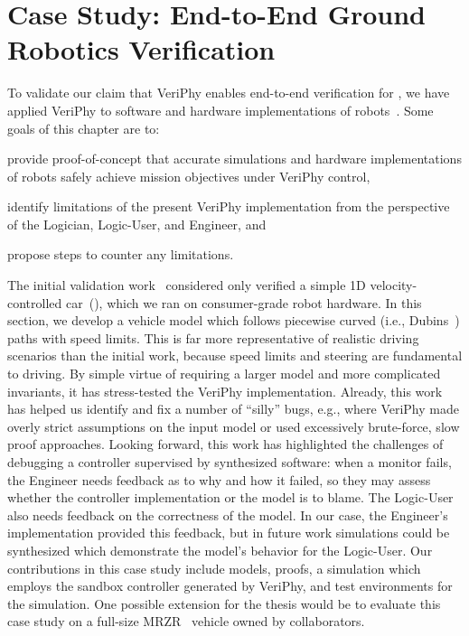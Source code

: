 \documentclass[12pt]{cmuthesis}
\theoremstyle{definition}
\theoremstyle{remark}
\newcommand{\rref}[2][]{\prettyref{#2}}
\newcommand{\VeriPhy}{VeriPhy\xspace}
\begin{document}
\section{Case Study: End-to-End Ground Robotics Verification}
\label{sec:ground-robotics}
To validate our claim that \VeriPhy enables end-to-end verification for \dL, we have applied \VeriPhy to software and hardware implementations of robots~\cite{DBLP:journals/ral/BohrerTMSP19}.
Some goals of this chapter are to:
\begin{inparaenum}[i)]
\item provide proof-of-concept that accurate simulations and hardware implementations of robots safely achieve mission objectives under \VeriPhy control,
\item identify limitations of the present \VeriPhy implementation from the perspective of the Logician, Logic-User, and Engineer, and
\item propose steps to counter any limitations.
\end{inparaenum}
The initial validation work~\cite{DBLP:conf/pldi/BohrerTMMP18} considered only verified a simple 1D velocity-controlled car~(\rref{ex:driving-game}), which we ran on consumer-grade robot hardware.
In this section, we develop a vehicle model which follows piecewise curved (i.e., Dubins~\cite{citeulike:12223454}) paths with speed limits.
This is far more representative of realistic driving scenarios than the initial work, because speed limits and steering are fundamental to driving.
By simple virtue of requiring a larger model and more complicated invariants, it has stress-tested the \VeriPhy implementation.
Already, this work has helped us identify and fix a number of ``silly'' bugs, e.g., where \VeriPhy made overly strict assumptions on the input model or used excessively brute-force, slow proof approaches.
Looking forward, this work has highlighted the challenges of debugging a controller supervised by synthesized software: when a monitor fails, the Engineer needs feedback as to why and how it failed, so they may assess whether the controller implementation or the model is to blame.
The Logic-User also needs feedback on the correctness of the model.
In our case, the Engineer's implementation provided this feedback, but in future work simulations could be synthesized which demonstrate the model's behavior for the Logic-User.
Our contributions in this case study include \dL models, proofs, a simulation which employs the sandbox controller generated by \VeriPhy, and test environments for the simulation.
One possible extension for the thesis would be to evaluate this case study on a full-size MRZR~\cite{MRZR} vehicle owned by collaborators.
\end{document}
